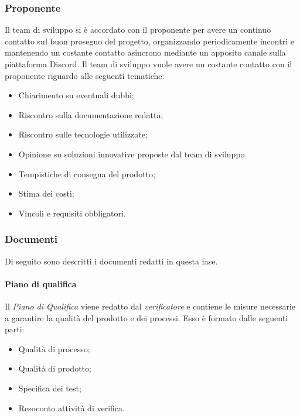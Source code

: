 \subsubsection{Proponente}\label{subsubsection: proponente_fornitura}
Il team di sviluppo si è accordato con il proponente per avere un continuo contatto sul buon proseguo del progetto, organizzando periodicamente incontri e mantenendo un costante contatto asincrono mediante un apposito canale sulla piattaforma Discord.
Il team di sviluppo vuole avere un costante contatto con il proponente riguardo alle seguenti tematiche:
\begin {itemize}
    \item Chiarimento su eventuali dubbi;
    \item Riscontro sulla documentazione redatta;
    \item Riscontro sulle tecnologie utilizzate;
    \item Opinione su soluzioni innovative proposte dal team di sviluppo
    \item Tempistiche di consegna del prodotto;
    \item Stima dei costi;
    \item Vincoli e requisiti obbligatori.
\end{itemize}
\subsubsection {Documenti}\label{subsubsection: documenti_fornitura}
Di seguito sono descritti i documenti redatti in questa fase.
\paragraph{Piano di qualifica}\label{paragraph: PdQ_fornitura}
Il \textit{Piano di Qualifica} viene redatto dal \textit{verificatore} e contiene le misure necessarie a garantire la qualità del prodotto e dei processi.
Esso è formato dalle seguenti parti:
\begin{itemize}
    \item Qualità di processo;
    \item Qualità di prodotto;
    \item Specifica dei test;
    \item Resoconto attività di verifica.
\end{itemize}
